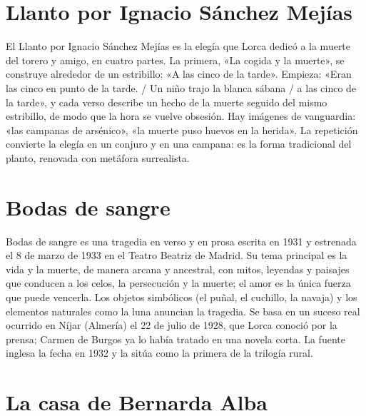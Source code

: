 \documentclass{book}
\begin{document}

\section{Llanto por Ignacio Sánchez Mejías}

El Llanto por Ignacio Sánchez Mejías es la elegía que Lorca dedicó a la muerte del torero y amigo, en cuatro partes. La primera, «La cogida y la muerte», se construye alrededor de un estribillo: «A las cinco de la tarde». Empieza: «Eran las cinco en punto de la tarde. / Un niño trajo la blanca sábana / a las cinco de la tarde», y cada verso describe un hecho de la muerte seguido del mismo estribillo, de modo que la hora se vuelve obsesión. Hay imágenes de vanguardia: «las campanas de arsénico», «la muerte puso huevos en la herida». La repetición convierte la elegía en un conjuro y en una campana: es la forma tradicional del planto, renovada con metáfora surrealista.


\section{Bodas de sangre}

Bodas de sangre es una tragedia en verso y en prosa escrita en 1931 y estrenada el 8 de marzo de 1933 en el Teatro Beatriz de Madrid. Su tema principal es la vida y la muerte, de manera arcana y ancestral, con mitos, leyendas y paisajes que conducen a los celos, la persecución y la muerte; el amor es la única fuerza que puede vencerla. Los objetos simbólicos (el puñal, el cuchillo, la navaja) y los elementos naturales como la luna anuncian la tragedia. Se basa en un suceso real ocurrido en Níjar (Almería) el 22 de julio de 1928, que Lorca conoció por la prensa; Carmen de Burgos ya lo había tratado en una novela corta. La fuente inglesa la fecha en 1932 y la sitúa como la primera de la trilogía rural.


\section{La casa de Bernarda Alba}
\end{document}

